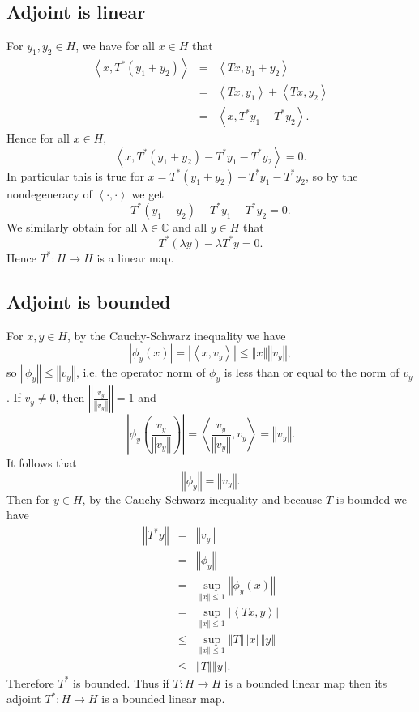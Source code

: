 \documentclass{article}
\newcommand{\inner}[2]{\left\langle #1, #2 \right\rangle}
\newcommand{\norm}[1]{\left\Vert #1 \right\Vert}
\begin{document}
\subsection{Adjoint is linear}
For $y_1,y_2 \in H$, we have for all $x \in H$ that
\begin{eqnarray*}
\inner{x}{T^*(y_1+y_2)}&=&\inner{Tx}{y_1+y_2}\\
&=&\inner{Tx}{y_1}+\inner{Tx}{y_2}\\
&=&\inner{x}{T^*y_1+T^*y_2}.
\end{eqnarray*}
Hence for all $x \in H$,
\[
\inner{x}{T^*(y_1+y_2)-T^*y_1-T^*y_2}=0.
\]
In particular this is true for $x=T^*(y_1+y_2)-T^*y_1-T^*y_2$, so by the nondegeneracy of $\inner{\cdot}{\cdot}$ we get
\[
T^*(y_1+y_2)-T^*y_1-T^*y_2=0.
\]
We similarly obtain for all $\lambda \in \mathbb{C}$ and all $y \in H$ that
\[
T^*(\lambda y)- \lambda T^*y=0.
\]
Hence $T^*:H \to H$ is a linear map. 

\subsection{Adjoint is bounded}
For $x, y \in H$, by the Cauchy-Schwarz inequality we have
\[
|\phi_y(x)|  = |\inner{x}{v_y}| \leq \norm{x} \norm{v_y},
\]
so $\norm{\phi_y} \leq \norm{v_y}$, i.e. the operator norm of $\phi_y$ is less than or equal to the norm of $v_y$.
If $v_y \neq 0$, then $\norm{\frac{v_y}{\norm{v_y}}}=1$ and
\[
\left| \phi_y \left( \frac{v_y}{\norm{v_y}} \right) \right| = \inner{\frac{v_y}{\norm{v_y}}}{v_y}=\norm{v_y}.
\]
It follows that
\[
\norm{\phi_y}=\norm{v_y}.
\]
Then for $y \in H$, by the Cauchy-Schwarz inequality and because $T$ is bounded we have
\begin{eqnarray*}
\norm{T^* y}&=&\norm{v_y}\\
&=&\norm{\phi_y}\\
&=&\sup_{\norm{x} \leq 1} \norm{\phi_y(x)}\\
&=&\sup_{\norm{x} \leq 1} |\inner{Tx}{y}|\\
&\leq&\sup_{\norm{x} \leq 1} \norm{T} \norm{x} \norm{y}\\
&\leq&\norm{T}\norm{y}.
\end{eqnarray*}
Therefore $T^*$ is bounded. Thus if $T:H \to H$ is a bounded linear map then its adjoint $T^*:H \to H$ is a bounded
linear map.
\end{document}
